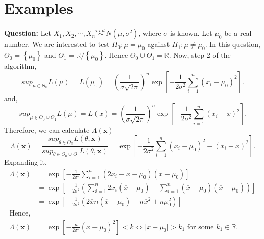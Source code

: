 \documentclass[a4paper]{article}
\begin{document}
\section{Examples}
\textbf{Question: }Let $X_1, X_2, \cdots, X_{n} \overset{i.i.d.}{\sim} N\left( \mu,\sigma^{2} \right) $, where $\sigma$ is known. Let $\mu_0$ be a real number. We are interested to test $H_0 : \mu = \mu_0$ against $H_1 : \mu \neq \mu_0$.
\newline\newline
In this question, $\Theta_0 = \left\{ \mu_0 \right\} $ and $\Theta_1 = \mathbb{R} /\left\{ \mu_0 \right\}$. Hence $\Theta_0 \cup \Theta_1 = \mathbb{R}$.
\newline\newline
Now, step 2 of the algorithm,
 \[
	 sup_{\mu \in \Theta_0}L\left( \mu \right) = L\left( \mu_0 \right) = \left( \frac{1}{\sigma\sqrt{2\pi} } \right)^{n} \exp\left[ - \frac{1}{2\sigma^{2}} \sum_{i = 1}^{n} \left( x_{i} - \mu_0 \right)^2 \right] 
.\] 
and,
\[
	sup_{\mu \in \Theta_0\cup\Theta_1}L\left( \mu \right) = L\left( \overline{x} \right)   = \left( \frac{1}{\sigma\sqrt{2\pi} } \right)^{n}\exp\left[ - \frac{1}{2\sigma^2}\sum_{i=1}^{n} \left( x_{i} - \overline{x} \right)^2  \right]  
.\]
Therefore, we can calculate $\Lambda\left( \mathbf{x} \right) $ 
\[
	\Lambda\left( \mathbf{x} \right) = \frac{sup_{\theta \in \Theta_0}L\left( \theta,\mathbf{x} \right) }{sup_{\theta \in \Theta_0\cup\Theta_1}L\left( \theta,\mathbf{x} \right) } = \exp\left[ -\frac{1}{2	\sigma^2}\sum_{i=1}^{n} \left( x_{i} - \mu_0\right)^2 - \left( x_{i} - \overline{x} \right)^2  \right]
.\] 
Expanding it,
\begin{equation*}
	\begin{split}
	\Lambda\left( \mathbf{x} \right) &= \exp\left[ -\frac{1}{2\sigma^2}\sum_{i=1}^{n} \left( 2x_{i} - \overline{x} - \mu_0\right)\left(  \overline{x} - \mu_0\right)  \right]\\
	&= \exp\left[ -\frac{1}{2\sigma^2}\left( \sum_{i=1}^{n} 2x_{i}\left( \overline{x} - \mu_0 \right) - \sum_{i=1}^{n} \left( \overline{x}+\mu_0 \right) \left( \overline{x}-\mu_0 \right)\right)  \right]\\	
        &= \exp\left[ -\frac{1}{2\sigma^2} \left(2\overline{x}n\left( \overline{x}-\mu_0 \right) - n\overline{x}^2 + n\mu_0^2\right) \right]\\
	\text{Hence,}\\
	\Lambda\left( \mathbf{x} \right) &=  \exp\left[ -\frac{n}{2\sigma^2}\left( \overline{x} - \mu_0 \right)^2 \right] < k \iff  \mid \overline{x} - \mu_0 \mid > k_1  \text{  for some $k_1 \in \mathbb{R}.$}
	\end{split}
\end{equation*}
\end{document}
